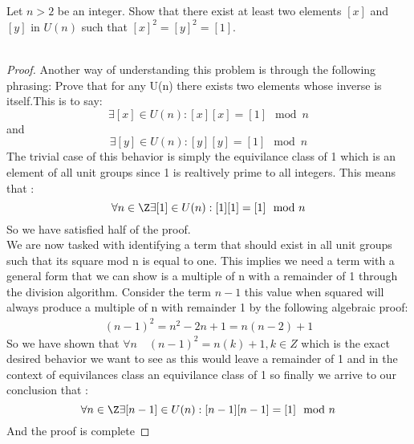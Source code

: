 \documentclass[11pt]{amsart}
\theoremstyle{definition}  %
\begin{document}
\noindent\makebox[\linewidth]{\rule{\paperwidth}{0.4pt}}
\\\\
 Let $n > 2$ be an integer. Show that there exist at least two elements $[x]$ and $[y]$ in $U(n)$ such that $[x]^2 = [y]^2 = [1]$.\\\\

\begin{proof}
  Another way of understanding this problem is through the following phrasing: Prove that for any U(n) there exists two elements whose inverse is itself.This is to say:
  \[
    \exists [x]\in U(n): [x][x]=[1] \mod n
  \]
  and
  \[
    \exists [y]\in U(n): [y][y]=[1] \mod n
  \]
  The trivial case of this behavior is simply the equivilance class of 1 which is an element of all unit groups since 1 is realtively prime to all integers. This means that :
  \[
    \forall  n\in \Z \exists [1]\in U(n): [1][1]=[1] \mod n
  \]
  So we have satisfied half of the proof.\\
  We are now tasked with identifying a term that should exist in all unit groups such that its square mod n is equal to one. This implies we need a term with a general form that we can show is a multiple of n with a remainder of 1 through the division algorithm.
  Consider the term $n-1$ this value when squared will always produce a multiple of n with remainder 1 by the following algebraic proof:
  \begin{align*}
    (n-1)^2=n^2-2n+1=n(n-2)+1
  \end{align*}
  So we have shown that $\forall n\quad (n-1)^2 = n(k)+1, k \in Z $ which is the exact desired behavior we want to see as this would leave a remainder of 1 and in the context of equivilances class an equivilance class of 1 so finally we arrive to our conclusion that :
  \[
    \forall  n\in \Z \exists [n-1]\in U(n): [n-1][n-1]=[1] \mod n
  \]
  And the proof is complete
\end{proof}
\noindent\makebox[\linewidth]{\rule{\paperwidth}{0.4pt}}
\end{document}
